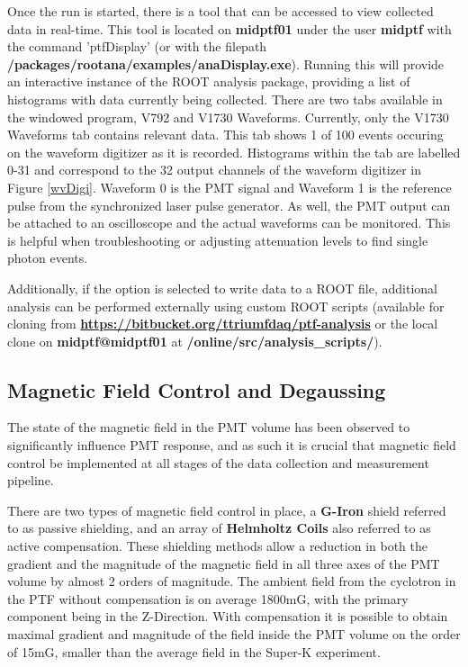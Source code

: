 \documentclass[twoside,letterpaper]{refart}
\begin{document}
Once the run is started, there is a tool that can be accessed to view collected data in real-time.  This tool is located on \textbf{midptf01} under the user \textbf{midptf} with the command 'ptfDisplay' (or with the filepath \textbf{/packages/rootana/examples/anaDisplay.exe}).  Running this will provide an interactive instance of the ROOT analysis package, providing a list of histograms with data currently being collected.  There are two tabs available in the windowed program, V792 and V1730 Waveforms. Currently, only the V1730 Waveforms tab contains relevant data.  This tab shows 1 of 100 events occuring on the waveform digitizer as it is recorded. Histograms within the tab are labelled 0-31 and correspond to the 32 output channels of the waveform digitizer in Figure \ref{wvDigi}. Waveform 0 is the PMT signal and Waveform 1 is the reference pulse from the synchronized laser pulse generator.  As well, the PMT output can be attached to an oscilloscope and the actual waveforms can be monitored. This is helpful when troubleshooting or adjusting attenuation levels to find single photon events.

Additionally, if the option is selected to write data to a ROOT file, additional analysis can be performed externally using custom ROOT scripts (available for cloning from \textbf{\url{https://bitbucket.org/ttriumfdaq/ptf-analysis}} or the local clone on \textbf{midptf@midptf01} at \textbf{/online/src/analysis\_scripts/}).

\subsection{Magnetic Field Control and Degaussing}

The state of the magnetic field in the PMT volume has been observed to significantly influence PMT response, and as such it is crucial that magnetic field control be implemented at all stages of the data collection and measurement pipeline. 

There are two types of magnetic field control in place, a \textbf{G-Iron} shield referred to as passive shielding, and an array of \textbf{Helmholtz Coils} also referred to as active compensation. These shielding methods allow a reduction in both the gradient and the magnitude of the magnetic field in all three axes of the PMT volume by almost 2 orders of magnitude. The ambient field from the cyclotron in the PTF without compensation is on average 1800mG, with the primary component being in the Z-Direction.  With compensation it is possible to obtain maximal gradient and magnitude of the field inside the PMT volume on the order of 15mG, smaller than the average field in the Super-K experiment.
\end{document}
